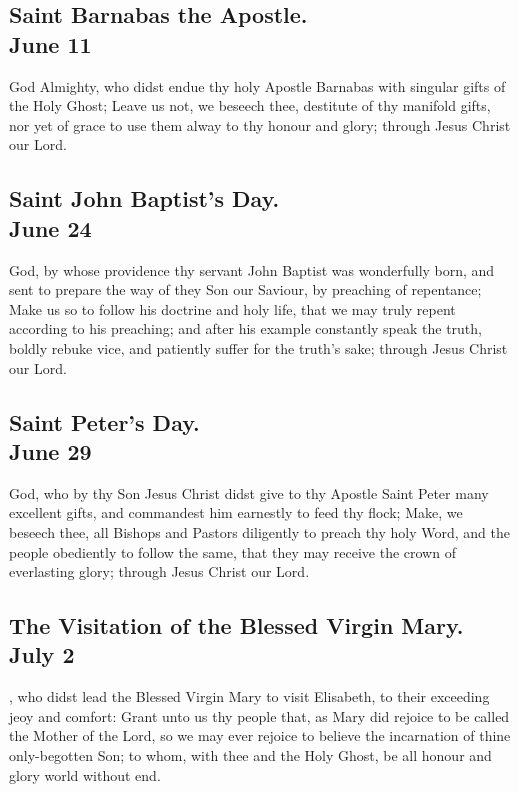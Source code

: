 \subsection{Saint Barnabas the Apostle.\\
June 11}
 God Almighty, who didst endue thy holy Apostle Barnabas with singular gifts of the Holy Ghost; Leave us not, we beseech thee, destitute of thy manifold gifts, nor yet of grace to use them alway to thy honour and glory; through Jesus Christ our Lord.

\subsection{Saint John Baptist's Day.\\
June 24}
 God, by whose providence thy servant John Baptist was wonderfully born, and sent to prepare the way of they Son our Saviour, by preaching of repentance; Make us so to follow his doctrine and holy life, that we may truly repent according to his preaching; and after his example constantly speak the truth, boldly rebuke vice, and patiently suffer for the truth's sake; through Jesus Christ our Lord.

\subsection{Saint Peter's Day.\\
June 29}
 God, who by thy Son Jesus Christ didst give to thy Apostle Saint Peter many excellent gifts, and commandest him earnestly to feed thy flock; Make, we beseech thee, all Bishops and Pastors diligently to preach thy holy Word, and the people obediently to follow the same, that they may receive the crown of everlasting glory; through Jesus Christ our Lord.

\subsection{The Visitation of the Blessed Virgin Mary.\\
July 2}
, who didst lead the Blessed Virgin Mary to visit Elisabeth, to their exceeding jeoy and comfort: Grant unto us thy people that, as Mary did rejoice to be called the Mother of the Lord, so we may ever rejoice to believe the incarnation of thine only-begotten Son; to whom, with thee and the Holy Ghost, be all honour and glory world without end.

